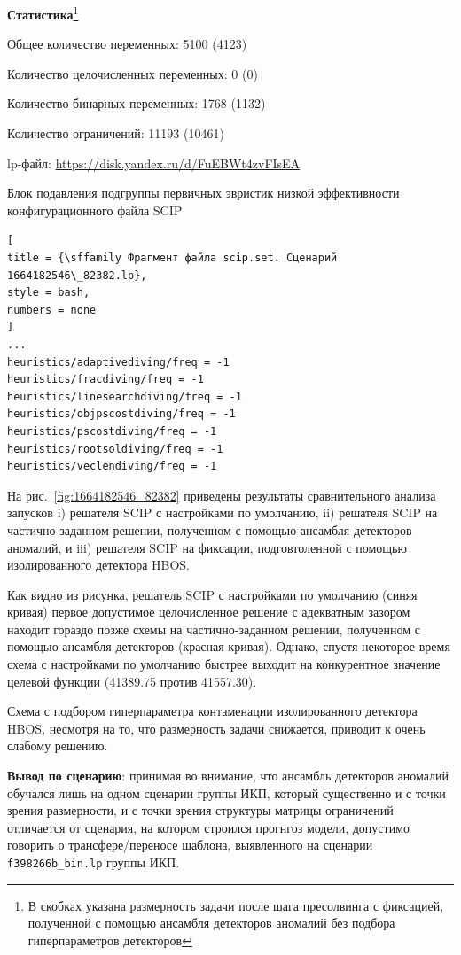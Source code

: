 \documentclass[%
	11pt,
	a4paper,
	utf8,
		]{article}
\begin{document}
\textbf{Статистика}\footnote{В скобках указана размерность задачи после шага пресолвинга с фиксацией, полученной с помощью ансамбля детекторов аномалий без подбора гиперпараметров детекторов}\vspace*{1mm}

Общее количество переменных: 5100 (4123)

Количество целочисленных переменных: 0 (0)

Количество бинарных переменных: 1768 (1132)

Количество ограничений: 11193 (10461)

lp-файл: \url{https://disk.yandex.ru/d/FuEBWt4zvFIsEA}

Блок подавления подгруппы первичных эвристик низкой эффективности конфигурационного файла SCIP
\begin{lstlisting}[
title = {\sffamily Фрагмент файла scip.set. Сценарий 1664182546\_82382.lp},
style = bash,
numbers = none
]
...
heuristics/adaptivediving/freq = -1
heuristics/fracdiving/freq = -1
heuristics/linesearchdiving/freq = -1
heuristics/objpscostdiving/freq = -1
heuristics/pscostdiving/freq = -1
heuristics/rootsoldiving/freq = -1
heuristics/veclendiving/freq = -1
\end{lstlisting}

На рис.~\ref{fig:1664182546_82382} приведены результаты сравнительного анализа запусков i) решателя SCIP с настройками по умолчанию, ii) решателя SCIP на частично-заданном решении, полученном с помощью ансамбля детекторов аномалий, и iii) решателя SCIP на фиксации, подговтоленной с помощью изолированного детектора HBOS.

Как видно из рисунка, решатель SCIP с настройками по умолчанию (синяя кривая) первое допустимое целочисленное решение с адекватным зазором находит гораздо позже схемы на частично-заданном решении, полученном с помощью ансамбля детекторов (красная кривая). Однако, спустя некоторое время схема с настройками по умолчанию быстрее выходит на конкурентное значение целевой функции (41389.75 против 41557.30).

Схема с подбором гиперпараметра контаменации изолированного детектора HBOS, несмотря на то, что размерность задачи снижается, приводит к очень слабому решению. 

\textbf{Вывод по сценарию}: принимая во внимание, что ансамбль детекторов аномалий обучался лишь на одном сценарии группы ИКП, который существенно и с точки зрения размерности, и с точки зрения структуры матрицы ограничений отличается от сценария, на котором строился прогнгоз модели, допустимо говорить о трансфере/переносе шаблона, выявленного на сценарии \texttt{f398266b\_bin.lp} группы ИКП.
\end{document}
